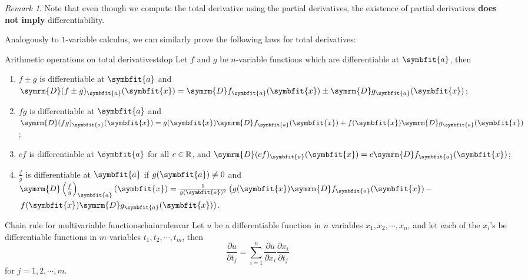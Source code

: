 \documentclass[math]{amznotes}
\theoremstyle{remark}
\newtheorem*{remark}{Remark}
\begin{document}
\begin{notebox}
    \begin{remark}
        Note that even though we compute the total derivative using the partial derivatives, the existence of partial derivatives {\color{red} \textbf{does not imply}} differentiability.
    \end{remark}
\end{notebox}
Analogously to $1$-variable calculus, we can similarly prove the following laws for total derivatives:
\begin{thmbox}{Arithmetic operations on total derivatives}{tdop}
    Let $f$ and $g$ be $n$-variable functions which are differentiable at $\symbfit{a}$, then
    \begin{enumerate}
        \item $f \pm g$ is differentiable at $\symbfit{a}$ and $\symrm{D}(f \pm g)_{\symbfit{a}}(\symbfit{x}) = \symrm{D}f_{\symbfit{a}}(\symbfit{x}) \pm \symrm{D}g_{\symbfit{a}}(\symbfit{x})$;
        \item $fg$ is differentiable at $\symbfit{a}$ and $\symrm{D}(fg)_{\symbfit{a}}(\symbfit{x}) = g(\symbfit{x})\symrm{D}f_{\symbfit{a}}(\symbfit{x}) + f(\symbfit{x})\symrm{D}g_{\symbfit{a}}(\symbfit{x})$;
        \item $cf$ is differentiable at $\symbfit{a}$ for all $c \in \mathbb{R}$, and $\symrm{D}(cf)_{\symbfit{a}}(\symbfit{x}) = c\symrm{D}f_{\symbfit{a}}(\symbfit{x})$;
        \item $\frac{f}{g}$ is differentiable at $\symbfit{a}$ if $g(\symbfit{a}) \neq 0$ and $\symrm{D}\left(\frac{f}{g}\right)_{\symbfit{a}}(\symbfit{x}) = \frac{1}{g(\symbfit{a})^2}\left(g(\symbfit{x})\symrm{D}f_{\symbfit{a}}(\symbfit{x}) \, - \right.$ \\
              $\left.f(\symbfit{x})\symrm{D}g_{\symbfit{a}}(\symbfit{x})\right)$.
    \end{enumerate}
\end{thmbox}
\begin{thmbox}{Chain rule for multivariable functions}{chainrulenvar}
    Let $u$ be a differentiable function in $n$ variables $x_1, x_2, \cdots, x_n$, and let each of the $x_i$'s be differentiable functions in $m$ variables $t_1, t_2, \cdots, t_m$, then
    \begin{equation*}
        \frac{\partial u}{\partial t_j} = \sum_{i = 1}^n \frac{\partial u}{\partial x_i}\frac{\partial x_i}{\partial t_j}
    \end{equation*}
    for $j = 1, 2, \cdots, m$.
\end{thmbox}
\end{document}
